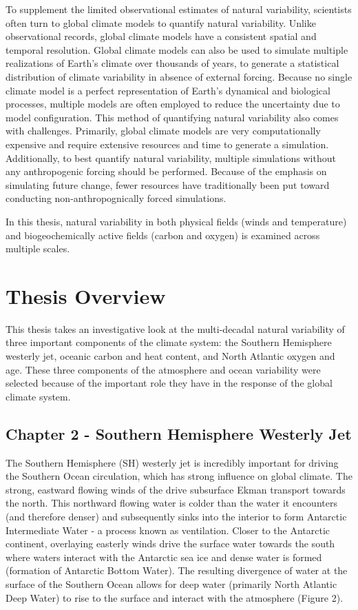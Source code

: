 To supplement the limited observational estimates of natural variability, scientists often turn to global climate models to quantify natural variability. Unlike observational records, global climate models have a consistent spatial and temporal resolution. Global climate models can also be used to simulate multiple realizations of Earth's climate over thousands of years, to generate a statistical distribution of climate variability in absence of external forcing. Because no single climate model is a perfect representation of Earth's dynamical and biological processes, multiple models are often employed to reduce the uncertainty due to model configuration. This method of quantifying natural variability also comes with challenges. Primarily, global climate models are very computationally expensive and require extensive resources and time to generate a simulation. Additionally, to best quantify natural variability, multiple simulations without any anthropogenic forcing should be performed. Because of the emphasis on simulating future change, fewer resources have traditionally been put toward conducting non-anthropognically forced simulations.

In this thesis, natural variability in both physical fields (winds and temperature) and biogeochemically active fields (carbon and oxygen) is examined across multiple scales.


\section{Thesis Overview}
This thesis takes an investigative look at the multi-decadal natural variability of three important components of the climate system: the Southern Hemisphere westerly jet, oceanic carbon and heat content, and North Atlantic oxygen and age. These three components of the atmosphere and ocean variability were selected because of the important role they have in the response of the global climate system.

\subsection{Chapter 2 - Southern Hemisphere Westerly Jet}
The Southern Hemisphere (SH) westerly jet is incredibly important for driving the Southern Ocean circulation, which has strong influence on global climate. The strong, eastward flowing winds of the drive subsurface Ekman transport towards the north. This northward flowing water is colder than the water it encounters (and therefore denser) and subsequently sinks into the interior to form Antarctic Intermediate Water - a process known as ventilation. Closer to the Antarctic continent, overlaying easterly winds drive the surface water towards the south where waters interact with the Antarctic sea ice and dense water is formed (formation of Antarctic Bottom Water). The resulting divergence of water at the surface of the Southern Ocean allows for deep water (primarily North Atlantic Deep Water) to rise to the surface and interact with the atmosphere (Figure 2).

